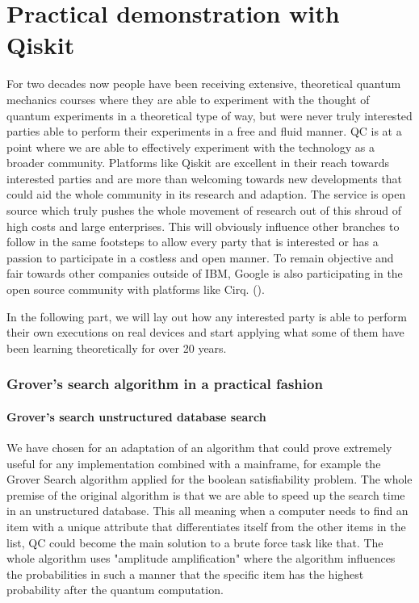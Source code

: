
\chapter{Practical demonstration with Qiskit}
\label{ch:practical}

For two decades now people have been receiving extensive, theoretical quantum mechanics courses where they are able to experiment with the thought of quantum experiments in a theoretical type of way, but were never truly interested parties able to perform their experiments in a free and fluid manner. QC is at a point where we are able to effectively experiment with the technology as a broader community. Platforms like Qiskit are excellent in their reach towards interested parties and are more than welcoming towards new developments that could aid the whole community in its research and adaption. The service is open source which truly pushes the whole movement of research out of this shroud of high costs and large enterprises. This will obviously influence other branches to follow in the same footsteps to allow every party that is interested or has a passion to participate in a costless and open manner. To remain objective and fair towards other companies outside of IBM, Google is also participating in the open source community with platforms like Cirq. (\textcite{Cirq}). 

In the following part, we will lay out how any interested party is able to perform their own executions on real devices and start applying what some of them have been learning theoretically for over 20 years.

\subsection{Grover's search algorithm in a practical fashion}
\subsubsection{Grover's search unstructured database search}

We have chosen for an adaptation of an algorithm that could prove extremely useful for any implementation combined with a mainframe, for example the Grover Search algorithm applied for the boolean satisfiability problem. The whole premise of the original algorithm is that we are able to speed up the search time in an unstructured database. This all meaning when a computer needs to find an item with a unique attribute that differentiates itself from the other items in the list, QC could become the main solution to a brute force task like that. The whole algorithm uses "amplitude amplification" where the algorithm influences the probabilities in such a manner that the specific item has the highest probability after the quantum computation. \autocite{Grover1996}


